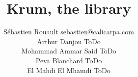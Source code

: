 \documentclass[twoside,11pt]{article}
\begin{document}
\title{Krum, the library}

\author{
    \name Sébastien Rouault \email sebastien@calicarpa.com \\
    \AND
    \name Arthur Danjou \email ToDo \\
    \AND
    \name Mohammad Ammar Said \email ToDo \\
    \AND
    \name Peva Blanchard \email ToDo \\
    \AND
    \name El Mahdi El Mhamdi \email ToDo}


\maketitle

\begin{abstract}%


\end{abstract}
\end{document}
